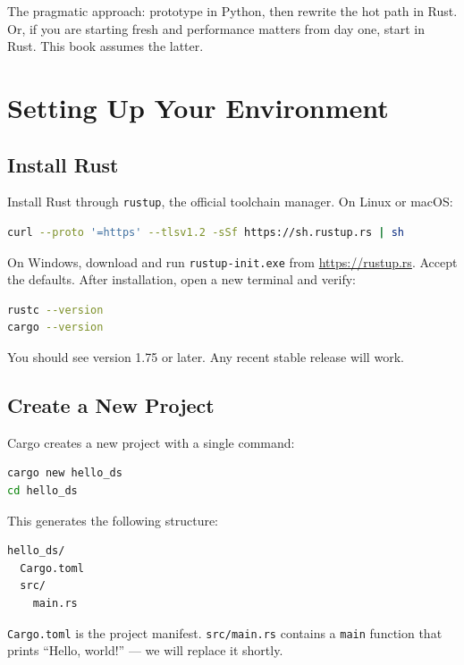 The pragmatic approach: prototype in Python, then rewrite the hot path in Rust.
Or, if you are starting fresh and performance matters from day one, start in
Rust. This book assumes the latter.


\section{Setting Up Your Environment}
\label{sec:setup}

\subsection{Install Rust}

Install Rust through \texttt{rustup}, the official toolchain manager. On Linux
or macOS:

\begin{lstlisting}[language=bash, numbers=none]
curl --proto '=https' --tlsv1.2 -sSf https://sh.rustup.rs | sh
\end{lstlisting}

On Windows, download and run \texttt{rustup-init.exe} from
\url{https://rustup.rs}. Accept the defaults. After installation, open a new
terminal and verify:

\begin{lstlisting}[language=bash, numbers=none]
rustc --version
cargo --version
\end{lstlisting}

You should see version 1.75 or later. Any recent stable release will work.

\subsection{Create a New Project}

Cargo creates a new project with a single command:

\begin{lstlisting}[language=bash, numbers=none]
cargo new hello_ds
cd hello_ds
\end{lstlisting}

This generates the following structure:

\begin{lstlisting}[language=bash, numbers=none]
hello_ds/
  Cargo.toml
  src/
    main.rs
\end{lstlisting}

\texttt{Cargo.toml} is the project manifest. \texttt{src/main.rs} contains a
\texttt{main} function that prints ``Hello, world!'' --- we will replace it
shortly.

